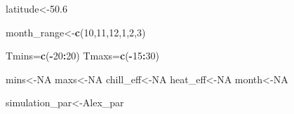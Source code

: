 \documentclass[
]{book}
\newenvironment{Shaded}{\begin{snugshade}}{\end{snugshade}}
\newcommand{\DecValTok}[1]{\textcolor[rgb]{0.00,0.00,0.81}{#1}}
\newcommand{\FloatTok}[1]{\textcolor[rgb]{0.00,0.00,0.81}{#1}}
\newcommand{\KeywordTok}[1]{\textcolor[rgb]{0.13,0.29,0.53}{\textbf{#1}}}
\newcommand{\NormalTok}[1]{#1}
\newcommand{\OperatorTok}[1]{\textcolor[rgb]{0.81,0.36,0.00}{\textbf{#1}}}
\newcommand{\OtherTok}[1]{\textcolor[rgb]{0.56,0.35,0.01}{#1}}
\begin{document}
\begin{Shaded}
\begin{Highlighting}[]
\NormalTok{latitude<-}\FloatTok{50.6}

\NormalTok{month_range<-}\KeywordTok{c}\NormalTok{(}\DecValTok{10}\NormalTok{,}\DecValTok{11}\NormalTok{,}\DecValTok{12}\NormalTok{,}\DecValTok{1}\NormalTok{,}\DecValTok{2}\NormalTok{,}\DecValTok{3}\NormalTok{)}

\NormalTok{Tmins=}\KeywordTok{c}\NormalTok{(}\OperatorTok{-}\DecValTok{20}\OperatorTok{:}\DecValTok{20}\NormalTok{)}
\NormalTok{Tmaxs=}\KeywordTok{c}\NormalTok{(}\OperatorTok{-}\DecValTok{15}\OperatorTok{:}\DecValTok{30}\NormalTok{)}

\NormalTok{mins<-}\OtherTok{NA}
\NormalTok{maxs<-}\OtherTok{NA}
\NormalTok{chill_eff<-}\OtherTok{NA}
\NormalTok{heat_eff<-}\OtherTok{NA}
\NormalTok{month<-}\OtherTok{NA}

\NormalTok{simulation_par<-Alex_par}


\end{Highlighting}
\end{Shaded}
\end{document}
